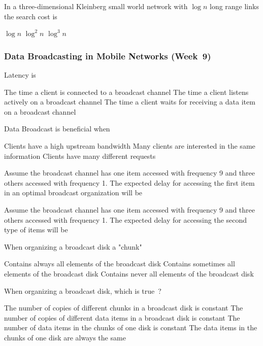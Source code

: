 \documentclass[12pt,a4paper]{exam} %
\begin{document}
\begin{flushleft}
\begin{multicols*}{2}
\begin{questions}
\question In a three-dimensional Kleinberg small world network with $\log n$ long range links the search cost is
\begin{checkboxes}
\CorrectChoice $\log n$
\choice $\log^2 n$
\choice $\log^3 n$
\end{checkboxes}

\subsubsection{Data Broadcasting in Mobile Networks (Week~9)}

\question Latency is
\begin{checkboxes}
\choice The time a client is connected to a broadcast channel
\choice The time a client listens actively on a broadcast channel
\CorrectChoice The time a client waits for receiving a data item on a broadcast channel 
\end{checkboxes}

\question Data Broadcast is beneficial when
\begin{checkboxes}
\choice Clients have a high upstream bandwidth
\CorrectChoice Many clients are interested in the same information
\choice Clients have many different requests
\end{checkboxes}

\question Assume the broadcast channel has one item accessed with frequency 9 and three others accessed with frequency 1. The expected delay for accessing the first item in an optimal broadcast organization will be
\begin{checkboxes}
\end{checkboxes}

\question Assume the broadcast channel has one item accessed with frequency 9 and three others accessed with frequency 1. The expected delay for accessing the second type of items will be
\begin{checkboxes}
\end{checkboxes}

\question When organizing a broadcast disk a "chunk"
\begin{checkboxes}
\choice Contains always all elements of the broadcast disk
\CorrectChoice Contains sometimes all elements of the broadcast disk
\choice Contains never all elements of the broadcast disk
\end{checkboxes}

\question When organizing a broadcast disk, which is true~?
\begin{checkboxes}
\CorrectChoice The number of copies of different chunks in a broadcast disk is constant
\choice The number of copies of different data items in a broadcast disk is constant
\CorrectChoice The number of data items in the chunks of one disk is constant
\choice The data items in the chunks of one disk are always the same
\end{checkboxes}


\end{questions}
\end{multicols*}
\end{flushleft}
\end{document}
